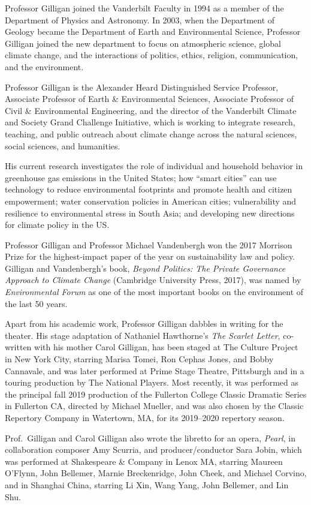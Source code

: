 \documentclass[11pt,twoside]{jgsyllabus}\usepackage[]{graphicx}\usepackage[]{xcolor}
\begin{document}
Professor Gilligan joined the Vanderbilt Faculty in 1994 as a member of the
Department of Physics and Astronomy. In 2003, when the Department of Geology
became the Department of Earth and Environmental Science, Professor Gilligan
joined the new department to focus on atmospheric science, global climate change,
and the interactions of politics, ethics, religion, communication, and the
environment.
\fi

Professor Gilligan is
the Alexander Heard Distinguished Service Professor,
Associate Professor of Earth \& Environmental Sciences,
Associate Professor of Civil \& Environmental Engineering, and
the director of the Vanderbilt Climate and Society Grand Challenge Initiative,
which is working to integrate research, teaching, and public outreach about
climate change across the natural sciences, social sciences, and humanities.

His current research investigates the role of individual and household behavior
in greenhouse gas emissions in the United States;
how ``smart cities'' can use technology to reduce environmental footprints and
promote health and citizen empowerment;
water conservation policies in American cities;
vulnerability and resilience to environmental stress in South Asia;
and developing new directions for climate policy in the US.

Professor Gilligan and Professor Michael Vandenbergh won
the 2017 Morrison Prize for the highest-impact paper of the year
on sustainability law and policy.
Gilligan and Vandenbergh's book, %
\emph{Beyond Politics: The Private Governance Approach to Climate Change\/}
(Cambridge University Press, 2017),
was named by \emph{Environmental Forum\/} as one of the most
important books on the environment of the last 50 years.

Apart from his academic work, Professor Gilligan dabbles in writing for the
theater. His stage adaptation of Nathaniel Hawthorne's %
\emph{The Scarlet Letter},
co-written with his mother Carol Gilligan, has been staged at The Culture
Project in New York City, starring
Marisa Tomei, Ron Cephas Jones, and Bobby Cannavale, and was later performed
at Prime Stage Theatre, Pittsburgh and in a touring production by The National
Players. Most recently, it was performed as the principal fall 2019 production
of the Fullerton College Classic Dramatic Series in Fullerton CA,
directed by Michael Mueller,
and was also chosen by the Classic Repertory Company in Watertown, MA,
for its 2019--2020 repertory season.

Prof.\ Gilligan and Carol Gilligan also wrote the libretto for an opera,
\emph{Pearl}, in collaboration composer Amy Scurria, and producer/conductor
Sara Jobin, which was performed at Shakespeare \& Company in Lenox MA,
starring Maureen O'Flynn, John Bellemer, Marnie Breckenridge, John Cheek, %
and Michael Corvino, and in Shanghai China,
starring Li Xin, Wang Yang, John Bellemer, and Lin Shu.
%
%
%
%
%
%
\end{document}

